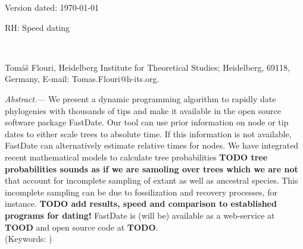 \documentclass{llncs}
\newcommand{\ejmcomment}[1]{{\color{green} #1}}
\renewcommand{\subsubsection}[1]{%
\vspace{2ex}
\noindent
\textit{#1.}---}
\begin{document}
\begin{flushright}
Version dated: \today
\end{flushright}
\bigskip
\noindent RH: Speed dating


\bigskip
\medskip
\begin{center}

\bigskip




\\
\end{center}
\medskip
{} Tom\'{a}\v{s} Flouri, 
Heidelberg Institute for Theoretical Studies; Heidelberg, 69118, Germany, E-mail: Tomas.Flouri@h-its.org.\\


\vspace{1in}

\subsubsection{Abstract} We present a dynamic programming algorithm to rapidly
date phylogenies with thousands of tips and make it available in the open source software package FastDate. 
Our tool can use prior information on node or tip dates to either scale trees to absolute time.
If this information is not available, FastDate can alternatively estimate relative times for nodes.
We have integrated recent mathematical models to calculate tree probabilities {\bf TODO tree probabilities sounds as if we are samoling over trees which we are not} 
that account for
incomplete  sampling of extant as well as ancestral species.
This incomplete sampling can be due to fossilization and recovery processes, for instance.
{\bf TODO add results, speed and comparison to established programs for dating!}
FastDate is \ejmcomment{(will be)} available as a web-service at {\bf TOOD} and open source code at {\bf TODO}.\\
\noindent (Keywords: )\\
\end{document}
